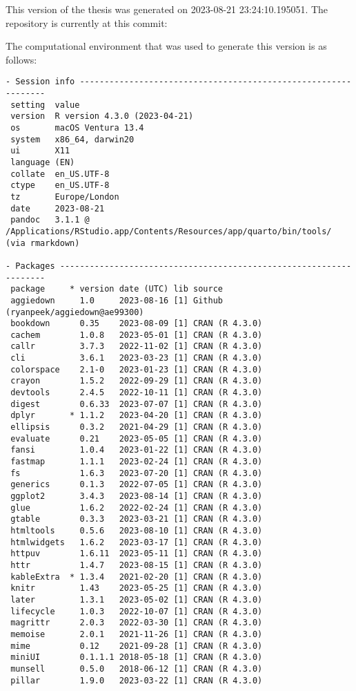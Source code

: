 \documentclass[twoside,12pt,final]{ucthesis-CA2012}
\begin{document}
\begin{ucmainmatter}
This version of the thesis was generated on 2023-08-21 23:24:10.195051. The repository is currently at this commit:

The computational environment that was used to generate this version is as follows:
\begin{verbatim}
- Session info ---------------------------------------------------------------
 setting  value
 version  R version 4.3.0 (2023-04-21)
 os       macOS Ventura 13.4
 system   x86_64, darwin20
 ui       X11
 language (EN)
 collate  en_US.UTF-8
 ctype    en_US.UTF-8
 tz       Europe/London
 date     2023-08-21
 pandoc   3.1.1 @ /Applications/RStudio.app/Contents/Resources/app/quarto/bin/tools/ (via rmarkdown)

- Packages -------------------------------------------------------------------
 package     * version date (UTC) lib source
 aggiedown     1.0     2023-08-16 [1] Github (ryanpeek/aggiedown@ae99300)
 bookdown      0.35    2023-08-09 [1] CRAN (R 4.3.0)
 cachem        1.0.8   2023-05-01 [1] CRAN (R 4.3.0)
 callr         3.7.3   2022-11-02 [1] CRAN (R 4.3.0)
 cli           3.6.1   2023-03-23 [1] CRAN (R 4.3.0)
 colorspace    2.1-0   2023-01-23 [1] CRAN (R 4.3.0)
 crayon        1.5.2   2022-09-29 [1] CRAN (R 4.3.0)
 devtools      2.4.5   2022-10-11 [1] CRAN (R 4.3.0)
 digest        0.6.33  2023-07-07 [1] CRAN (R 4.3.0)
 dplyr       * 1.1.2   2023-04-20 [1] CRAN (R 4.3.0)
 ellipsis      0.3.2   2021-04-29 [1] CRAN (R 4.3.0)
 evaluate      0.21    2023-05-05 [1] CRAN (R 4.3.0)
 fansi         1.0.4   2023-01-22 [1] CRAN (R 4.3.0)
 fastmap       1.1.1   2023-02-24 [1] CRAN (R 4.3.0)
 fs            1.6.3   2023-07-20 [1] CRAN (R 4.3.0)
 generics      0.1.3   2022-07-05 [1] CRAN (R 4.3.0)
 ggplot2       3.4.3   2023-08-14 [1] CRAN (R 4.3.0)
 glue          1.6.2   2022-02-24 [1] CRAN (R 4.3.0)
 gtable        0.3.3   2023-03-21 [1] CRAN (R 4.3.0)
 htmltools     0.5.6   2023-08-10 [1] CRAN (R 4.3.0)
 htmlwidgets   1.6.2   2023-03-17 [1] CRAN (R 4.3.0)
 httpuv        1.6.11  2023-05-11 [1] CRAN (R 4.3.0)
 httr          1.4.7   2023-08-15 [1] CRAN (R 4.3.0)
 kableExtra  * 1.3.4   2021-02-20 [1] CRAN (R 4.3.0)
 knitr         1.43    2023-05-25 [1] CRAN (R 4.3.0)
 later         1.3.1   2023-05-02 [1] CRAN (R 4.3.0)
 lifecycle     1.0.3   2022-10-07 [1] CRAN (R 4.3.0)
 magrittr      2.0.3   2022-03-30 [1] CRAN (R 4.3.0)
 memoise       2.0.1   2021-11-26 [1] CRAN (R 4.3.0)
 mime          0.12    2021-09-28 [1] CRAN (R 4.3.0)
 miniUI        0.1.1.1 2018-05-18 [1] CRAN (R 4.3.0)
 munsell       0.5.0   2018-06-12 [1] CRAN (R 4.3.0)
 pillar        1.9.0   2023-03-22 [1] CRAN (R 4.3.0)

\end{verbatim}
\end{ucmainmatter}
\end{document}
